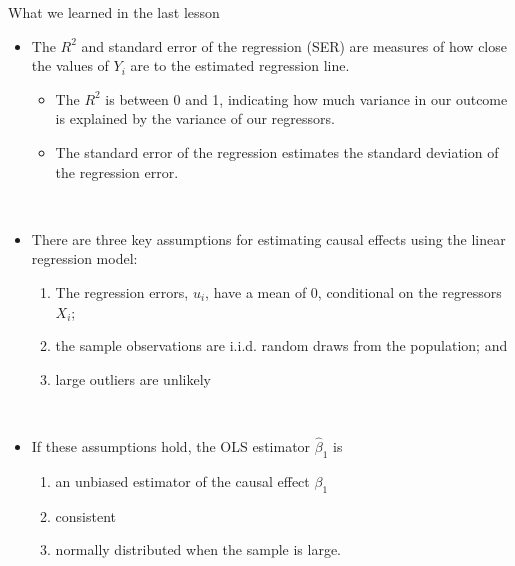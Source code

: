\documentclass[notes,10pt, aspectratio=169]{beamer}
\begin{document}
\begin{frame}{What we learned in the last lesson}
\begin{itemize}
    \item The $R^2$ and standard error of the regression (SER) are measures of how close the values of $Y_i$ are to the estimated regression line.\\
    \begin{itemize}
        \item The $R^2$ is between 0 and 1, indicating how much variance in our outcome is explained by the variance of our regressors.
        \item The standard error of the regression estimates the standard deviation of the regression error.
    \end{itemize}\\[1em]
    \item There are three key assumptions for estimating causal effects using the linear regression model:
    \begin{enumerate}
        \item The regression errors, $u_i$, have a mean of 0, conditional on the regressors $X_i$;
        \item the sample observations are i.i.d. random draws from the population; and 
        \item large outliers are unlikely
    \end{enumerate}\\[1em]
   \item If these assumptions hold, the OLS estimator $\hat{\beta}_1$ is 
    \begin{enumerate}
        \item  an unbiased estimator of the causal effect ${\beta}_1$
        \item consistent
        \item normally distributed when the sample is large.
    \end{enumerate}
\end{itemize}
\end{frame}
\end{document}
